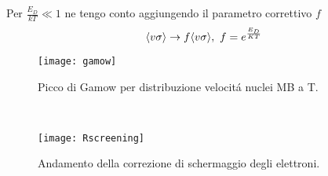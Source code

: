\documentclass[../main.tex]{subfiles}
\begin{document}
Per $\frac{E_D}{kT}\ll1$ ne tengo conto aggiungendo il parametro correttivo $f$
\begin{equation}
\exv{v\sigma}\to f\exv{v\sigma},\ f=\exp{\frac{E_D}{KT}}
\end{equation}


\begin{figure*}[!h]
    \centering
  \begin{subfigure}[t]{0.5\textwidth}
        \texttt{[image: gamow]}
        \caption{Picco di Gamow per distribuzione velocit\'a nuclei MB a T.}
    \end{subfigure}%
    ~
    \begin{subfigure}[t]{0.5\textwidth}
        \texttt{[image: Rscreening]}
        \caption{Andamento della correzione di schermaggio degli elettroni.}
    \end{subfigure}
\end{figure*}

\begin{comment}
\begingroup
\color{grey}
La composizione chimica \'e modificata dalle reazioni di fusione che per gli elementi principali, assumendo condizione di equilibrio secolare, riassumo
\begin{subequations}\label{subeqn:fusionchange}
\begin{align}
&\dot{X}=\frac{m_p}{N_A}(-3r_{pp}+2r_{33}-r_{34}-4r_{p14})\\ 
&\dot{Y}_3=\frac{m_{He3}}{N_A}(r_{pp}-2r_{33}-r_{34})\\
&\dot{Y}=\frac{m_{He4}}{N_A}(r_{33}+r_{34}+r_{p14})
\end{align}
\end{subequations}

con $r_{ik}$ rate di reazione per unit\'a di massa:

\begin{align}
&r_{ik}=\frac{\rho N_A^2X_iX_k}{(1+\delta_{ik})A_iA_k}\lambda_{ik}\shortintertext{dove, introducendo il fattore astrofisico $S(E)$, la massa ridotta dei due reagenti $m_{ik}$}\nonumber\\
&\lambda_{ik}=\sqrt{\frac{8}{m_{ik}\pi}}\frac{S_{ik}|_{E=0}}{(kT)\expy{\frac{3}{2}}}\intzi{}\exp{(-\frac{E}{kT}-\frac{b}{\sqrt{E}})}\,dE,\ b=31.28Z_1Z_2\sqrt{\frac{m_{ik}}{m_u}}\,(KeV)\expy{-1}\label{eq:astrofactor}
\end{align}

\endgroup

\end{comment}
\end{document}
